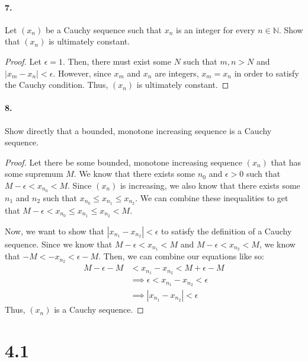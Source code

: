\documentclass[12pt]{article}
\newcommand\N{\mathbb{N}}
\theoremstyle{remark}
\begin{document}
\paragraph{7.} Let $(x_n)$ be a Cauchy sequence such that $x_n$ is an integer for every $n \in \N$. Show that $(x_n)$ is ultimately constant.
\begin{proof}
    Let $\epsilon = 1$. Then, there must exist some $N$ such that $m, n > N$ and $|x_m - x_n| < \epsilon$. However, since $x_m$ and $x_n$ are integers, $x_m = x_n$ in order to satisfy the Cauchy condition. Thus, $(x_n)$ is ultimately constant.
\end{proof}

\paragraph{8.} Show directly that a bounded, monotone increasing sequence is a Cauchy sequence.
\begin{proof}
    Let there be some bounded, monotone increasing sequence $(x_n)$ that has some supremum $M$. We know that there exists some $n_0$ and $\epsilon > 0$ such that $M - \epsilon < x_{n_0} < M$. Since $(x_n)$ is increasing, we also know that there exists some $n_1$ and $n_2$ such that $x_{n_0} \leq x_{n_1} \leq x_{n_2}$. We can combine these inequalities to get that $M - \epsilon < x_{n_0} \leq x_{n_1} \leq x_{n_2} < M$.

    Now, we want to show that $|x_{n_1} - x_{n_2}| < \epsilon$ to satisfy the definition of a Cauchy sequence. Since we know that $M - \epsilon < x_{n_1} < M$ and $M - \epsilon < x_{n_2} < M$, we know that $-M < -x_{n_2} < \epsilon - M$. Then, we can combine our equations like so:
    \begin{align*}
        M - \epsilon - M &< x_{n_1} - x_{n_2} < M + \epsilon - M \\
        &\implies \epsilon < x_{n_1} - x_{n_2} < \epsilon \\
        &\implies |x_{n_1} - x_{n_2}| < \epsilon
    \end{align*}
    Thus, $(x_n)$ is a Cauchy sequence.
\end{proof}

\section*{4.1}
\end{document}
